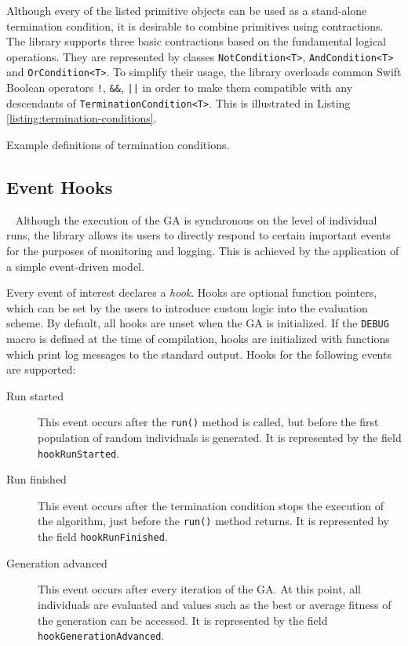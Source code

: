 Although every of the listed primitive objects can be used as a stand-alone termination condition, it is desirable to combine primitives using contractions. The library supports three basic contractions based on the fundamental logical operations. They are represented by classes \texttt{NotCondition<T>}, \texttt{AndCondition<T>} and \texttt{OrCondition<T>}. To simplify their usage, the library overloads common Swift Boolean operators \texttt{!}, \texttt{\&\&}, \texttt{||} in order to make them compatible with any descendants of \texttt{TerminationCondition<T>}. This is illustrated in Listing \ref{listing:termination-conditions}.

\begin{listing}[ht]
	\caption{Example definitions of termination conditions.}
	\label{listing:termination-conditions}
\end{listing}

\subsection{Event Hooks}~\label{section:event-hooks}
Although the execution of the GA is synchronous on the level of individual runs, the library allows its users to directly respond to certain important events for the purposes of monitoring and logging. This is achieved by the application of a simple event-driven model.

Every event of interest declares a \textit{hook}. Hooks are optional function pointers, which can be set by the users to introduce custom logic into the evaluation scheme. By default, all hooks are unset when the GA is initialized. If the \texttt{DEBUG} macro is defined at the time of compilation, hooks are initialized with functions which print log messages to the standard output. Hooks for the following events are supported:
~
\begin{description}
	\item[Run started]
	This event occurs after the \texttt{run()} method is called, but before the first population of random individuals is generated. It is represented by the field \texttt{hookRunStarted}.

	\item[Run finished]
	This event occurs after the termination condition stops the execution of the algorithm, just before the \texttt{run()} method returns. It is represented by the field \texttt{hookRunFinished}.

	\item[Generation advanced]
	This event occurs after every iteration of the GA. At this point, all individuals are evaluated and values such as the best or average fitness of the generation can be accessed. It is represented by the field \texttt{hookGenerationAdvanced}.
\end{description}

